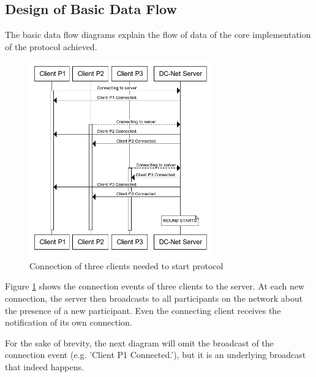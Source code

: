 \subsection{Design of Basic Data Flow}
The basic data flow diagrams explain the flow of data of the core implementation of the protocol achieved.


\begin{figure}[H]
    \centering
    \includegraphics[width=0.7\textwidth]{Images/Design/clientsConnection.png}
    \caption{Connection of three clients needed to start protocol}
    \label{fig:clientsConnection}
\end{figure}


Figure \ref{fig:clientsConnection} shows the connection events of three clients to the server. At each new connection, the server then broadcasts to all participants on the network about the presence of a new participant. Even the connecting client receives the notification of its own connection.

For the sake of brevity, the next diagram will omit the broadcast of the connection event (e.g. 'Client P1 Connected.'), but it is an underlying broadcast that indeed happens.


